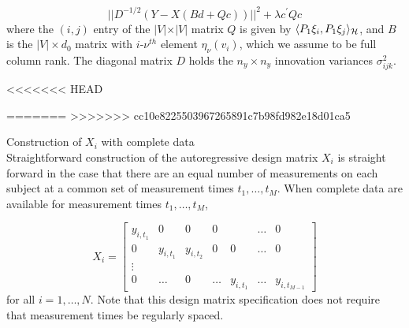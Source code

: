 \begin{equation} \label{eq:ar-design-matrix-1}
\vert \vert D^{-1/2}\left( Y - X \left( Bd + Qc \right) \right) \vert \vert^2  + \lambda c^\prime Q c 
\end{equation}
\noindent
where the $\left(i,j\right)$ entry of the $\vert V \vert \times \vert V \vert$ matrix $Q$ is given by $\langle P_1 \xi_i,  P_1 \xi_j \rangle_{\mathcal{H}}$, and $B$ is the $\vert V \vert \times d_0$ matrix with $i$-$\nu^{th}$ element $\eta_\nu\left(v_i\right)$, which we assume to be full column rank.  The diagonal matrix $D$ holds the $n_y \times n_y$  innovation variances $\sigma^2_{ijk}$. 

\bigskip

<<<<<<< HEAD

=======
>>>>>>> cc10e8225503967265891c7b98fd982e18d01ca5
\begin{example}{Construction of $X_i$ with complete data}
\\
Straightforward construction of the autoregressive design matrix $X_i$ is straight forward in the case that there are an equal number of measurements on each subject at a common set of measurement times $t_1,\dots, t_M$. When complete data are available for measurement times $t_1, \dots, t_M$, 

\begin{equation}
X_i =  \begin{bmatrix} 
y_{i, t_1} & 0 & 0 &0&& \dots & 0 \\
 0 & y_{i, t_1} &  y_{i, t_2}&0 &0& \dots & 0 \\
 \vdots &&&&&&\\
 0 & \dots &0 & \dots& y_{i,t_1} & \dots &  y_{i, t_{M-1}}
\end{bmatrix}
\end{equation}
\noindent
for all $i = 1,\dots, N$. Note that this design matrix specification does not require that measurement times be regularly spaced.  
\end{example}

